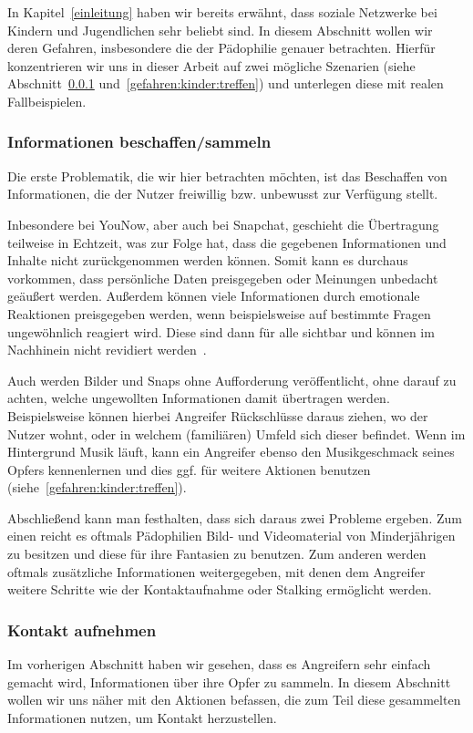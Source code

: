 In Kapitel~\ref{einleitung} haben wir bereits erw\"ahnt, dass soziale Netzwerke
bei Kindern und Jugendlichen sehr beliebt sind. In diesem Abschnitt wollen wir
deren Gefahren, insbesondere die der P\"adophilie genauer betrachten. Hierf\"ur
konzentrieren wir uns in dieser Arbeit auf zwei m\"ogliche Szenarien (siehe
Abschnitt~\ref{gefahren:kinder:informationen}
und~\ref{gefahren:kinder:treffen}) und unterlegen diese mit realen
Fallbeispielen.

\subsubsection{Informationen beschaffen/sammeln}
\label{gefahren:kinder:informationen}
Die erste Problematik, die wir hier betrachten m\"ochten, ist das Beschaffen von
Informationen, die der Nutzer freiwillig bzw. unbewusst zur Verf\"ugung stellt.

Inbesondere bei YouNow, aber auch bei Snapchat, geschieht die \"Ubertragung
teilweise in Echtzeit, was zur Folge hat, dass die gegebenen Informationen und
Inhalte nicht zur\"uckgenommen werden k\"onnen. Somit kann es durchaus
vorkommen, dass pers\"onliche Daten preisgegeben oder Meinungen unbedacht
ge\"au{\ss}ert werden. Au{\ss}erdem k\"onnen viele Informationen durch
emotionale Reaktionen preisgegeben werden, wenn beispielsweise auf bestimmte
Fragen ungew\"ohnlich reagiert wird. Diese sind dann f\"ur alle sichtbar und
k\"onnen im Nachhinein nicht revidiert werden~\cite{KS15}.

Auch werden Bilder und Snaps ohne Aufforderung ver\"offentlicht, ohne darauf zu
achten, welche ungewollten Informationen damit \"ubertragen werden.
Beispielsweise k\"onnen hierbei Angreifer R\"uckschl\"usse daraus ziehen, wo
der Nutzer wohnt, oder in welchem (famili\"aren) Umfeld sich dieser befindet.
Wenn im Hintergrund Musik l\"auft, kann ein Angreifer ebenso den Musikgeschmack
seines Opfers kennenlernen und dies ggf. f\"ur weitere Aktionen benutzen
(siehe~\ref{gefahren:kinder:treffen}).

Abschlie{\ss}end kann man festhalten, dass sich daraus zwei Probleme ergeben.
Zum einen reicht es oftmals P\"adophilien Bild- und Videomaterial von
Minderj\"ahrigen zu besitzen und diese f\"ur ihre Fantasien zu benutzen. Zum
anderen werden oftmals zus\"atzliche Informationen weitergegeben, mit denen dem
Angreifer weitere Schritte wie der Kontaktaufnahme oder Stalking erm\"oglicht
werden.

\subsubsection{Kontakt aufnehmen}
Im vorherigen Abschnitt haben wir gesehen, dass es Angreifern sehr einfach
gemacht wird, Informationen \"uber ihre Opfer zu sammeln. In diesem Abschnitt
wollen wir uns n\"aher mit den Aktionen befassen, die zum Teil diese
gesammelten Informationen nutzen, um Kontakt herzustellen.
\label{gefahren:kinder:treffen}
